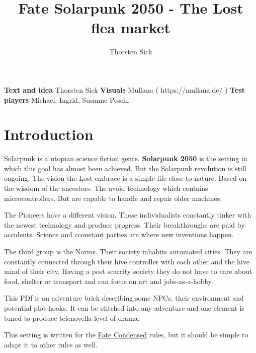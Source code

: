\documentclass{book}
\title{Fate Solarpunk 2050 - The Lost flea market}
\author{Thorsten Sick}
\begin{document}
%
%
\mbox{}
\thispagestyle{empty}
\BgThispage

\newpage
\begin{center}
\textbf{Text and idea}
\newline
Thorsten Sick
\newline
\textbf{Visuals}
\newline
Mullana ( https://mullana.de/ )
\newline
\textbf{Test players}
\newline
Michael, Ingrid, Susanne Peschl
\newline
\end{center}
\newpage

%

\chapter{Introduction}

Solarpunk is a utopian science fiction genre. \textbf{Solarpunk 2050} is the setting in which this goal has almost been achieved. But the Solarpunk revolution is still ongoing. The vision the Lost embrace is a simple life close to nature. Based on the wisdom of the ancestors. The avoid technology which contains microcontrollers. But are capable to handle and repair older machines.

The Pioneers have a different vision. Those individualists constantly tinker with the newest technology and produce progress. Their breakthroughs are paid by accidents. Science and cconstant parties are where new inventions happen.

The third group is the Norms. Their society inhabits automated cities. They are constantly connected through their hive controller with each other and the hive mind of their city. Having a post scarcity society they do not have to care about food, shelter or transport and can focus on art and jobs-as-a-hobby.

This PDf is an adventure brick describing some NPCs, their environment and potential plot hooks. It can be stitched into any adventure and one element is tuned to produce telenovella level of drama.

This setting is written for the \href{https://fate-srd.com/fate-condensed}{Fate Condensed} rules, but it should be simple to adapt it to other rules as well.






\end{document}
